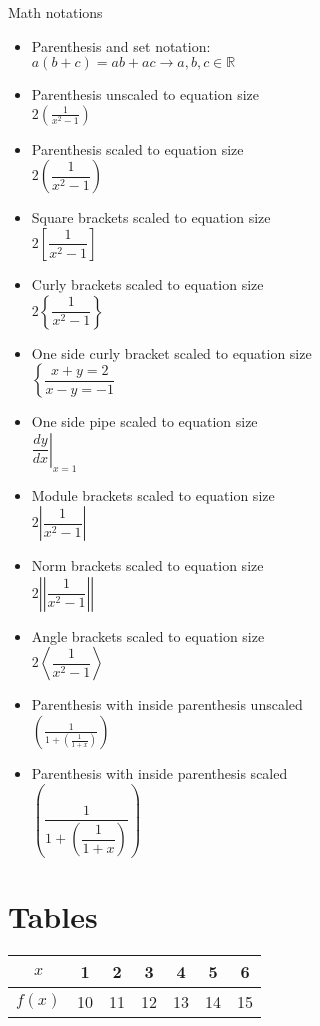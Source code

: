 \documentclass[12pt, a4paper]{article}
\begin{document}
Math notations

\begin{itemize}
    \item [] Parenthesis and set notation:\\$a(b+c) = ab + ac \rightarrow a, b, c \in \mathbb{R}$
    \item [] Parenthesis unscaled to equation size\\$2\left(\frac{1}{x^{2}-1}\right)$
    \item [] Parenthesis scaled to equation size\\$2\left(\dfrac{1}{x^{2}-1}\right)$
    \item [] Square brackets scaled to equation size\\$2\left[\dfrac{1}{x^{2}-1}\right]$
    \item [] Curly brackets scaled to equation size\\$2\left\{\dfrac{1}{x^{2}-1}\right\}$
    \item [] One side curly bracket scaled to equation size\\$\left\{\dfrac{x+y = 2}{x-y=-1}\right.$
    \item[] One side pipe scaled to equation size\\$\left.\dfrac{dy}{dx}\right|_{x=1}$
    \item[] Module brackets scaled to equation size\\$2\left|\dfrac{1}{x^{2}-1}\right|$
    \item[] Norm brackets scaled to equation size\\$2\left|\left|\dfrac{1}{x^{2}-1}\right|\right|$
    \item[] Angle brackets scaled to equation size\\$2\left\langle\dfrac{1}{x^{2}-1}\right\rangle$
    \item[] Parenthesis with inside parenthesis unscaled\\$\left(\frac{1}{1+\left(\frac{1}{1+x}\right)}\right)$
    \item[] Parenthesis with inside parenthesis scaled\\$\left(\dfrac{1}{1+\left(\dfrac{1}{1+x}\right)}\right)$
\end{itemize}

\section{Tables}

\begin{tabular}{|c|c|c|c|c|c|c|}\hline%
$x$ & 1 & 2 & 3 & 4 & 5 & 6 \\\hline
$f(x)$ & 10 & 11 & 12 & 13 & 14 & 15 \\\hline
\end{tabular}
\end{document}
